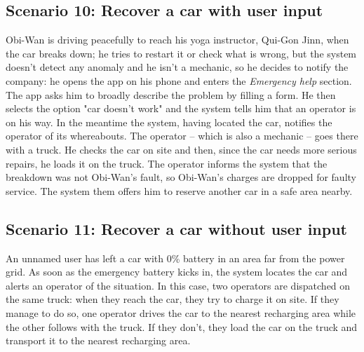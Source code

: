 \subsection{Scenario 10: Recover a car with user input}
	Obi-Wan is driving peacefully to reach his yoga instructor, Qui-Gon Jinn, when the car breaks down; he tries to restart it or check what is wrong, but the system doesn't detect any anomaly and he isn't a mechanic, so he decides to notify the company: he opens the app on his phone and enters the \textit{Emergency help} section. The app asks him to broadly describe the problem by filling a form. He then selects the option "car doesn't work" and the system tells him that an operator is on his way. In the meantime the system, having located the car, notifies the operator of its whereabouts. The operator – which is also a mechanic – goes there with a truck. He checks the car on site and then, since the car needs more serious repairs, he loads it on the truck. The operator informs the system that the breakdown was not Obi-Wan's fault, so Obi-Wan's charges are dropped for faulty service. The system them offers him to reserve another car in a safe area nearby. %
	
\subsection{Scenario 11: Recover a car without user input} %
	An unnamed user has left a car with 0\% battery in an area far from the power grid. As soon as the emergency battery kicks in, the system locates the car and alerts an operator of the situation. In this case, two operators are dispatched on the same truck: when they reach the car, they try to charge it on site. If they manage to do so, one operator drives the car to the nearest recharging area while the other follows with the truck. If they don't, they load the car on the truck and transport it to the nearest recharging area. %